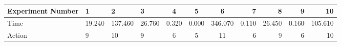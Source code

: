 \documentclass[8pt]{article}
\begin{document}
\begin{landscape}
\begin{tabular}{ | l | l | l | l | c | c | c | r | r | r | r | }
 \hline 
Experiment Number & 1 & 2 & 3 & 4 & 5 & 6 & 7 & 8 & 9 & 10\\ \hline
Time & 19.240 & 137.460 & 26.760 & 0.320 & 0.000 & 346.070 & 0.110 & 26.450 & 0.160 & 105.610\\ \hline
Action & 9 & 10 & 9 & 6 & 5 & 11 & 6 & 9 & 6 & 10\\ \hline\end{tabular}
\end{landscape}
\end{document}
